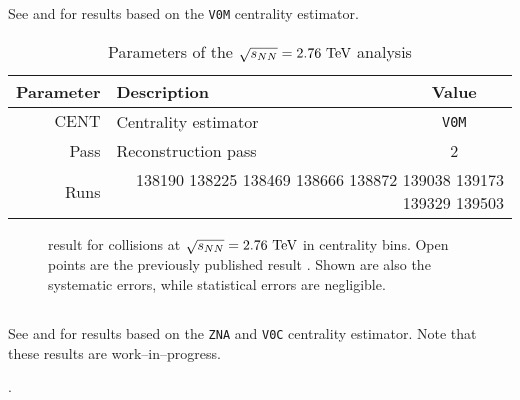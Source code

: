 \subsection{\PbPbCol{}}

See  and  for results
based on the \texttt{V0M} centrality estimator. 

\begin{table}[h!tbp]
  \caption{Parameters of the \PbPbCol{} $\usNN{PbPb}{2760}$ analysis}
  \centering
  \begin{tabular}[t]{|rlc|}
    \hline
    \headColor{} 
    \textbf{Parameter}
    & \textbf{Description}
    & \textbf{Value}\\
    \hline 
    $\text{CENT}$ 
    & Centrality estimator 
    & \texttt{V0M}\\
    \hline 
    \altRowColor{}
    \textsf{Pass} 
    & Reconstruction pass 
    & 2\\
    Runs 
    & \multicolumn{2}{r|}{138190 138225 138469 138666 138872 139038
      139173 139329 139503}\\ 
    \hline
  \end{tabular}
  \label{tab:PbPb:params}
\end{table}


\begin{figure}[h!tbp]
  \centering
  \caption{\ndndeta{} result for \PbPbCol{} collisions at
    $\usNN{PbPb}{2760}$ in centrality bins.  Open points are the
    previously published result \cite{Abbas:2013bpa}. Shown are also
    the systematic errors, while statistical errors are negligible.  }
  \label{fig:PbPb:results}
\end{figure}

\subsection{\pPbCol{}}

See  and  for results
based on the \texttt{ZNA} and \texttt{V0C} centrality estimator.  Note
that these results are work--in--progress. 

.


